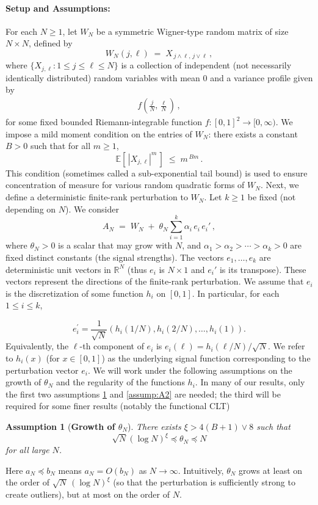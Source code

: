 \documentclass[11pt, reqno]{amsart}
\numberwithin{equation}{section}
\newtheorem{assumption}{Assumption}[section]
\begin{document}
\paragraph{\bf Setup and Assumptions:} 
For each $N \ge 1$, let $W_N$ be a symmetric Wigner-type random matrix of size $N\times N$, defined by
\begin{equation}\label{eq:WignerTypeMatrix} W_N(j,\ell) \;=\; X_{\,j \wedge \ell,\, j \vee \ell}\,,
\end{equation} where $\{X_{j,\ell}: 1 \le j \le \ell \le N\}$ is a collection of independent (not necessarily
identically distributed) random variables with mean 0 and a variance profile given by
\begin{align*}
f\left(\frac{j}{N},\frac{\ell}{N}\right)\,,
\end{align*} 
for some fixed bounded Riemann-integrable function $f: [0,1]^2 \to [0,\infty)$. We impose a mild moment condition on the entries of $W_N$: there exists a constant $B>0$ such
that for all $m \ge 1$, \begin{equation}\label{eq:momentcond} \mathbb{E}[\,|X_{j,\ell}|^m\,] \;\le\; m^{\,B
m}\,. \end{equation} This condition (sometimes called a sub-exponential tail bound) is used to ensure
concentration of measure for various random quadratic forms of $W_N$.
Next, we define a deterministic finite-rank perturbation to $W_N$. Let $k \ge 1$ be fixed (not depending
on $N$). We consider \begin{equation}\label{eq:perturndefn} A_N \;=\; W_N \;+\; \theta_N \sum_{i=1}^{k}
\alpha_i\, e_i\,e_i'\,, \end{equation} where $\theta_N > 0$ is a scalar that may grow with $N$, and $\alpha_1
> \alpha_2 > \cdots > \alpha_k > 0$ are fixed distinct constants (the signal strengths). The vectors $e_1,\dots,e_k$ are deterministic unit vectors in $\mathbb{R}^N$ (thus $e_i$ is $N\times 1$ and $e_i'$ is its
transpose). These vectors represent the directions of the finite-rank perturbation. We assume that $e_i$ is
the discretization of some function $h_i$ on $[0,1]$. In particular, for each $1 \le i \le k$,

$$e_i^{\prime}=\frac{1}{\sqrt{N}}\left(h_i(1 / N), h_i(2 / N), \ldots, h_i(1)\right).$$
Equivalently, the $\ell$-th component of $e_i$ is $e_i(\ell) = h_i(\ell/N)/\sqrt{N}$. We refer to $h_i(x)$ (for
$x\in[0,1]$) as the underlying signal function corresponding to the perturbation vector $e_i$.
We will work under the following assumptions on the growth of $\theta_N$ and the regularity of the
functions $h_i$. In many of our results, only the first two assumptions \ref{assump:A1} and \ref{assump:A2} are needed; the third will
be required for some finer results (notably the functional CLT)
\begin{assumption}[{\bf Growth of \(\theta_N\)}]\label{assump:A1}
There exists $\xi > 4(B+1) \vee 8$ such that
\[
\sqrt{N}(\log N)^{\xi} \preceq \theta_N \preceq N
\]
for all large $N$.
\end{assumption}
Here $a_N \preceq b_N$ means $a_N = O(b_N)$ as $N\to\infty$. Intuitively, $
\theta_N$ grows at least on the order of $\sqrt{N}\,(\log N)^\xi$ (so that the perturbation is
sufficiently strong to create outliers), but at most on the order of $N$.
\end{document}
